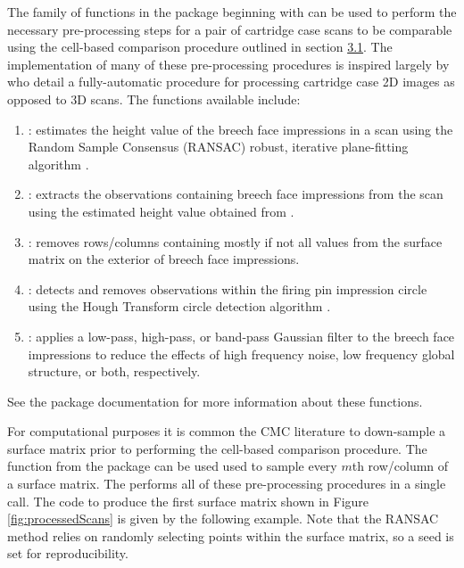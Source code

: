 The family of functions in the  package beginning with
 can be used to perform the necessary pre-processing
steps for a pair of cartridge case scans to be comparable using the
cell-based comparison procedure outlined in section
\protect\hyperlink{comparisonProcedure}{3.1}. The implementation of many
of these pre-processing procedures is inspired largely by
\citet{tai_fully_2018} who detail a fully-automatic procedure for
processing cartridge case 2D images as opposed to 3D scans. The
functions available include:

\begin{enumerate}
\item {}: estimates the height value of the breech face impressions in a scan using the Random Sample Consensus (RANSAC) robust, iterative plane-fitting algorithm \citep{ransac}.

\item {}: extracts the observations containing breech face impressions from the scan using the estimated height value obtained from .

\item {}: removes rows/columns containing mostly if not all  values from the surface matrix on the exterior of breech face impressions.

\item {}: detects and removes observations within the firing pin impression circle using the Hough Transform circle detection algorithm \citep{hough}.

\item {}: applies a low-pass, high-pass, or band-pass Gaussian filter to the breech face impressions to reduce the effects of high frequency noise, low frequency global structure, or both, respectively.
\end{enumerate}

See the  package documentation for more information about
these functions.

For computational purposes it is common the CMC literature to
down-sample a surface matrix prior to performing the cell-based
comparison procedure. The  function from the
 package can be used used to sample every \(m\)th
row/column of a surface matrix. The
 performs all of these
pre-processing procedures in a single call. The code to produce the
first surface matrix shown in Figure \ref{fig:processedScans} is given
by the following example. Note that the RANSAC method relies on randomly
selecting points within the surface matrix, so a seed is set for
reproducibility.

